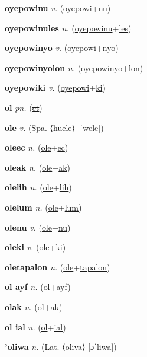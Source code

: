 \textbf{\hypertarget{oyepowinu}{oyepowinu}} \textit{v.} (\hyperlink{oyepowi}{oyepowi}+\allowbreak \hyperlink{nu}{nu})


\textbf{\hypertarget{oyepowinules}{oyepowinules}} \textit{n.} (\hyperlink{oyepowinu}{oyepowinu}+\allowbreak \hyperlink{les}{les})


\textbf{\hypertarget{oyepowinyo}{oyepowinyo}} \textit{v.} (\hyperlink{oyepowi}{oyepowi}+\allowbreak \hyperlink{nyo}{nyo})


\textbf{\hypertarget{oyepowinyolon}{oyepowinyolon}} \textit{n.} (\hyperlink{oyepowinyo}{oyepowinyo}+\allowbreak \hyperlink{lon}{lon})


\textbf{\hypertarget{oyepowiki}{oyepowiki}} \textit{v.} (\hyperlink{oyepowi}{oyepowi}+\allowbreak \hyperlink{ki}{ki})


\textbf{\hypertarget{ol}{ol}} \textit{pn.} (\hyperlink{et}{\sout{et}})


\textbf{\hypertarget{ole}{ole}} \textit{v.} (Spa. ⟨huele⟩ [ˈwele])


\textbf{\hypertarget{oleec}{oleec}} \textit{n.} (\hyperlink{ole}{ole}+\allowbreak \hyperlink{ec}{ec})


\textbf{\hypertarget{oleak}{oleak}} \textit{n.} (\hyperlink{ole}{ole}+\allowbreak \hyperlink{ak}{ak})


\textbf{\hypertarget{olelih}{olelih}} \textit{n.} (\hyperlink{ole}{ole}+\allowbreak \hyperlink{lih}{lih})


\textbf{\hypertarget{olelum}{olelum}} \textit{n.} (\hyperlink{ole}{ole}+\allowbreak \hyperlink{lum}{lum})


\textbf{\hypertarget{olenu}{olenu}} \textit{v.} (\hyperlink{ole}{ole}+\allowbreak \hyperlink{nu}{nu})


\textbf{\hypertarget{oleki}{oleki}} \textit{v.} (\hyperlink{ole}{ole}+\allowbreak \hyperlink{ki}{ki})


\textbf{\hypertarget{oletapalon}{oletapalon}} \textit{n.} (\hyperlink{ole}{ole}+\allowbreak \hyperlink{tapalon}{tapalon})


\textbf{\hypertarget{ol ayf}{ol ayf}} \textit{n.} (\hyperlink{ol}{ol}+\allowbreak \hyperlink{ayf}{ayf})


\textbf{\hypertarget{olak}{olak}} \textit{n.} (\hyperlink{ol}{ol}+\allowbreak \hyperlink{ak}{ak})


\textbf{\hypertarget{ol ial}{ol ial}} \textit{n.} (\hyperlink{ol}{ol}+\allowbreak \hyperlink{ial}{ial})


\textbf{\hypertarget{'oliwa}{'oliwa}} \textit{n.} (Lat. ⟨oliva⟩ [ɔˈliwa])


